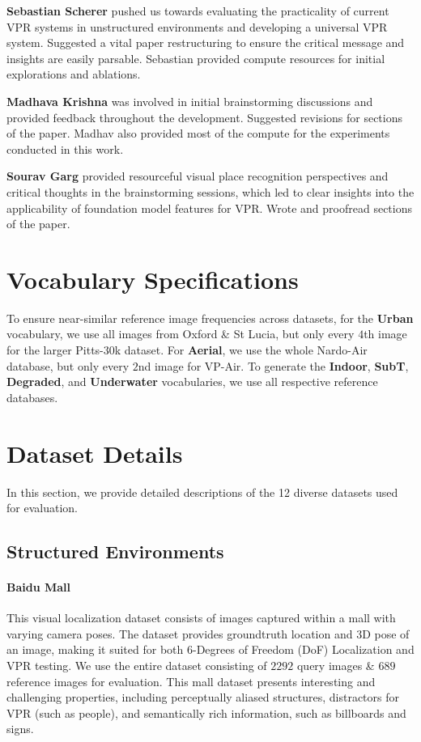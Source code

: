 \documentclass[letterpaper, 10 pt, conference]{ieeeconf}  \fi
\newcommand{\urban}[1]{\textbf{\textcolor{OutdoorDark}{Urban}}}
\newcommand{\indoor}[1]{\textbf{\textcolor{IndoorDark}{Indoor}}}
\newcommand{\aerial}[1]{\textbf{\textcolor{AerialDark}{Aerial}}}
\newcommand{\subt}[1]{\textbf{\textcolor{SubTDark}{SubT}}}
\newcommand{\degraded}[1]{\textbf{\textcolor{SubTDark}{Degraded}}}
\newcommand{\underwater}[1]{\textbf{\textcolor{UnderWaterDark}{Underwater}}}
\begin{document}
\textbf{Sebastian Scherer} pushed us towards evaluating the practicality of current VPR systems in unstructured environments and developing a universal VPR system. Suggested a vital paper restructuring to ensure the critical message and insights are easily parsable. Sebastian provided compute resources for initial explorations and ablations.

\textbf{Madhava Krishna} was involved in initial brainstorming discussions and provided feedback throughout the development. Suggested revisions for sections of the paper. Madhav also provided most of the compute for the experiments conducted in this work.

\textbf{Sourav Garg} provided resourceful visual place recognition perspectives and critical thoughts in the brainstorming sessions, which led to clear insights into the applicability of foundation model features for VPR. Wrote and proofread sections of the paper. \section{Vocabulary Specifications}
\label{sec:vocab_specs}

To ensure near-similar reference image frequencies across datasets, for the \urban{} vocabulary, we use all images from
Oxford \& St Lucia, but only every $4$th image for the larger Pitts-30k dataset.
For \aerial{}, we use the whole Nardo-Air database, but only every $2$nd image for VP-Air.
To generate the \indoor{}, \subt{}, \degraded{}, and \underwater{} vocabularies, we use all respective reference databases. \section{Dataset Details}

In this section, we provide detailed descriptions of the 12 diverse datasets used for evaluation.

\subsection{Structured Environments}
\label{sec:appendix_structured}

\paragraph{Baidu Mall} This visual localization dataset consists of images captured within a mall with varying camera poses. The dataset provides groundtruth location and 3D pose of an image, making it suited for both 6-Degrees of Freedom (DoF) Localization and VPR testing. We use the entire dataset consisting of $2292$ query images \& $689$ reference images for evaluation. This mall dataset presents interesting and challenging properties, including perceptually aliased structures, distractors for VPR (such as people), and semantically rich information, such as billboards and signs.
\end{document}
